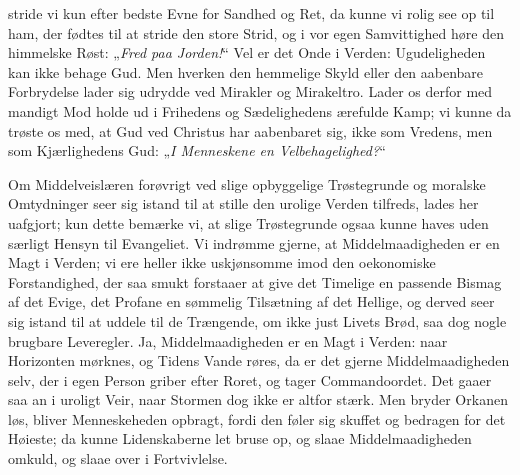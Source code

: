 \documentclass[12pt,a4paper]{book}
\begin{document}
stride vi kun efter bedste Evne for Sandhed og Ret, da kunne vi rolig see op til
ham, der fødtes til at stride den store Strid, og i vor egen Samvittighed høre
den himmelske Røst: „\emph{Fred paa Jorden!}“ Vel er det Onde i Verden:
Ugudeligheden kan ikke behage Gud. Men hverken den hemmelige Skyld eller den
aabenbare Forbrydelse lader sig udrydde
ved Mirakler og Mirakeltro. Lader os derfor med mandigt Mod holde ud i Frihedens
og Sædelighedens ærefulde Kamp; vi kunne da trøste os med, at Gud ved Christus
har aabenbaret sig, ikke som Vredens, men som Kjærlighedens Gud:
„\emph{I Menneskene en Velbehagelighed?}“

Om Middelveislæren forøvrigt ved slige opbyggelige Trøstegrunde og moralske
Omtydninger seer sig istand til at stille den urolige Verden tilfreds, lades her
uafgjort; kun dette bemærke vi, at slige Trøstegrunde ogsaa kunne haves uden
særligt Hensyn til Evangeliet. Vi indrømme gjerne, at Middelmaadigheden er en
Magt i Verden; vi ere heller ikke uskjønsomme imod den oekonomiske
Forstandighed, der saa smukt forstaaer at give det Timelige en passende Bismag
af det Evige, det Profane en sømmelig Tilsætning af det Hellige, og derved seer
sig istand til at uddele til de Trængende, om ikke just Livets Brød, saa dog
nogle brugbare Leveregler. Ja, Middelmaadigheden er en Magt i Verden: naar
Horizonten mørknes, og Tidens Vande røres, da er det gjerne Middelmaadigheden
selv, der i egen Person griber efter Roret, og tager Commandoordet. Det gaaer
saa an i uroligt Veir, naar Stormen dog ikke er altfor stærk. Men bryder Orkanen
løs, bliver Menneskeheden opbragt, fordi den føler sig skuffet og bedragen for
det Høieste; da kunne Lidenskaberne let bruse op, og slaae Middelmaadigheden
omkuld, og slaae over i Fortvivlelse.
\end{document}
